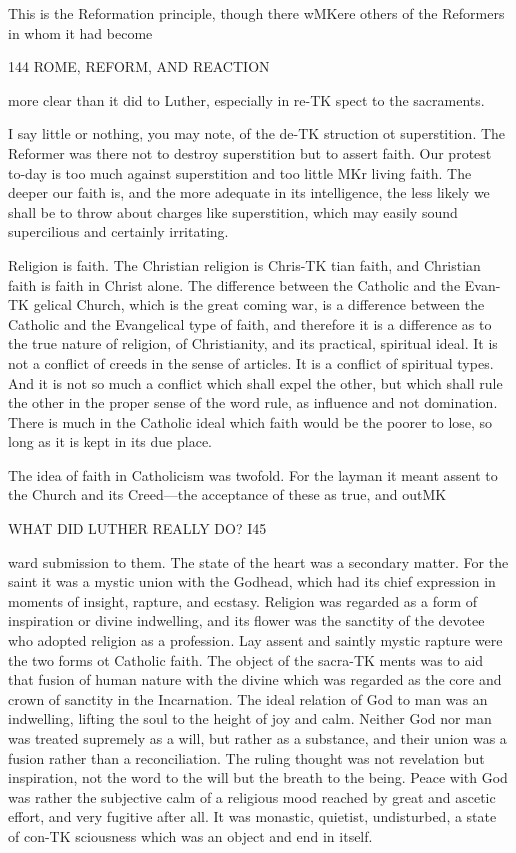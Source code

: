 \documentclass[12pt,a5paper,twoside]{book}
\begin{document}
{This is the Reformation principle, though there 
wMKere others of the Reformers in whom it had become 



144 ROME, REFORM, AND REACTION 

more clear than it did to Luther, especially in re-TK
spect to the sacraments. 

I say little or nothing, you may note, of the de-TK
struction ot superstition. The Reformer was there 
not to destroy superstition but to assert faith. Our 
protest to-day is too much against superstition and too 
little MKr living faith. The deeper our faith is, and the 
more adequate in its intelligence, the less likely we 
shall be to throw about charges like superstition, which 
may easily sound supercilious and certainly irritating. 

Religion is faith. The Christian religion is Chris-TK
tian faith, and Christian faith is faith in Christ alone. 
The difference between the Catholic and the Evan-TK
gelical Church, which is the great coming war, is a 
difference between the Catholic and the Evangelical 
type of faith, and therefore it is a difference as to the 
true nature of religion, of Christianity, and its practical, 
spiritual ideal. It is not a conflict of creeds in the 
sense of articles. It is a conflict of spiritual types. And 
it is not so much a conflict which shall expel the other, 
but which shall rule the other in the proper sense of 
the word rule, as influence and not domination. There 
is much in the Catholic ideal which faith would be the 
poorer to lose, so long as it is kept in its due place. 

The idea of faith in Catholicism was twofold. 
For the layman it meant assent to the Church and 
its Creed---the acceptance of these as true, and outMK 



WHAT DID LUTHER REALLY DO? I45 

ward submission to them. The state of the heart 
was a secondary matter. For the saint it was a 
mystic union with the Godhead, which had its chief 
expression in moments of insight, rapture, and ecstasy. 
Religion was regarded as a form of inspiration or 
divine indwelling, and its flower was the sanctity of 
the devotee who adopted religion as a profession. 
Lay assent and saintly mystic rapture were the two 
forms ot Catholic faith. The object of the sacra-TK
ments was to aid that fusion of human nature with 
the divine which was regarded as the core and 
crown of sanctity in the Incarnation. The ideal 
relation of God to man was an indwelling, lifting 
the soul to the height of joy and calm. Neither God 
nor man was treated supremely as a will, but rather 
as a substance, and their union was a fusion rather 
than a reconciliation. The ruling thought was not 
revelation but inspiration, not the word to the will 
but the breath to the being. Peace with God was 
rather the subjective calm of a religious mood reached 
by great and ascetic effort, and very fugitive after all. 
It was monastic, quietist, undisturbed, a state of con-TK
sciousness which was an object and end in itself. 

}
\end{document}
